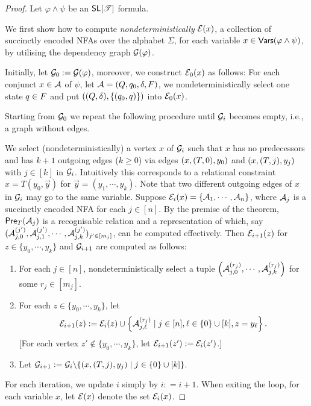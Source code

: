 \begin{proof}
Let $\varphi \wedge \psi$ be an $\textsf{SL}[\mathscr{T}]$ formula. 

We first show how to compute \emph{nondeterministically} $\mathcal{E}(x)$, a collection of succinctly encoded NFAs over the alphabet $\Sigma$, for each variable $x \in \mathsf{Vars}(\varphi \wedge \psi)$, by utilising the dependency graph $\mathcal{G}(\varphi)$. 

Initially, let $\mathcal{G}_0 := \mathcal{G}(\varphi)$, moreover, 
we construct $\mathcal{E}_0(x)$ as follows: For each conjunct $x \in \mathcal{A}$ of $\psi$, let $\mathcal{A} = (Q, q_0, \delta, F)$, we nondeterministically select one state $q \in F$ and put $((Q, \delta), \{(q_0, q)\})$ into $\mathcal{E}_0(x)$.
  

Starting from $\mathcal{G}_0$ we repeat the following procedure until %
$\mathcal{G}_i$ becomes empty, i.e., a graph without edges.
 
We select (nondeterministically) a vertex $x$ of $\mathcal{G}_i$ such that $x$ has no predecessors and has $k+1$ outgoing edges ($k\geq 0$) via edges $(x, (T, 0), y_0)$ and $(x, (T, j), y_j)$ with $j \in [k]$ in $\mathcal{G}_i$. 
Intuitively this corresponds to a relational constraint $x=T(y_0, \vec{y})$ for $\vec{y}=(y_1, \cdots, y_k)$. 
Note that two different outgoing edges of $x$ in $\mathcal{G}_i$ may go to the same variable.
Suppose $\mathcal{E}_i(x)=\{\mathcal{A}_1, \cdots, \mathcal{A}_n\}$, 
where $\mathcal{A}_j$ is a succinctly encoded NFA for each $j \in [n]$.
By the premise of the theorem, $\textsf{Pre}_{T}(\mathcal{A}_j)$ is a recognisable relation and a representation of which, say $(\mathcal{A}^{(j')}_{j, 0}, \mathcal{A}^{(j')}_{j, 1}, \cdots, \mathcal{A}^{(j')}_{j, k})_{ j'  \in [m_j]}$, can be computed effectively.
Then $\mathcal{E}_{i+1}(z)$ for $z \in  \{y_0,\cdots, y_k\}$ and $\mathcal{G}_{i+1}$ are computed as follows:
\begin{enumerate}
\item For each $j \in [n]$, nondeterministically select a tuple $\left(\mathcal{A}^{(r_j)}_{j, 0}, \cdots, \mathcal{A}^{(r_j)}_{j, k}\right)$ for some $r_j \in [m_j]$.
%
\item For each $z \in \{y_0,\cdots, y_k\}$, let
\[
    \mathcal{E}_{i+1}(z):= \mathcal{E}_{i}(z) \cup \left\{\mathcal{A}^{(r_j)}_{j, \ell} \mid  j \in [n], \ell \in \{0\} \cup [k], z = y_{\ell} \right\}.
\]
[For each vertex $z'  {\notin} \{y_0,\cdots, y_k\}$, let $\mathcal{E}_{i+1}(z') := \mathcal{E}_i(z')$.]
%
\item Let $\mathcal{G}_{i+1}:= \mathcal{G}_i \backslash \{(x, (T, j), y_j) \mid j \in \{0\} \cup [k]\}$.
\end{enumerate}
For each iteration, we update $i$ simply by  $i: = i+1$.
%
When exiting the loop, for each variable $x$, let $\mathcal{E}(x)$ denote the set $\mathcal{E}_i(x)$.


\end{proof}
